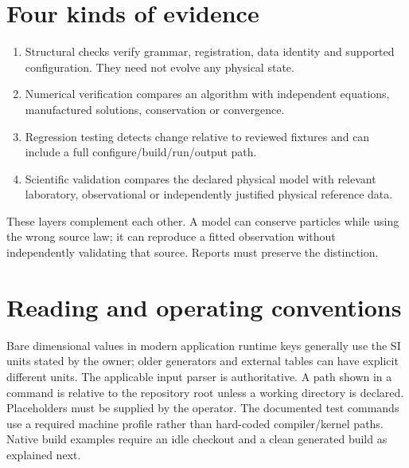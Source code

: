 \section{Four kinds of evidence}
\begin{enumerate}
\item Structural checks verify grammar, registration, data identity and
supported configuration. They need not evolve any physical state.
\item Numerical verification compares an algorithm with independent equations,
manufactured solutions, conservation or convergence.
\item Regression testing detects change relative to reviewed fixtures and can
include a full configure/build/run/output path.
\item Scientific validation compares the declared physical model with relevant
laboratory, observational or independently justified physical reference data.
\end{enumerate}
These layers complement each other. A model can conserve particles while
using the wrong source law; it can reproduce a fitted observation without
independently validating that source. Reports must preserve the distinction.

\section{Reading and operating conventions}
Bare dimensional values in modern application runtime keys generally use the
SI units stated by the owner; older generators and external tables can have
explicit different units. The applicable input parser is authoritative.
A path shown in a command is relative to the repository root unless a working
directory is declared. Placeholders must be supplied by the operator.
The documented test commands use a required machine profile rather than
hard-coded compiler/kernel paths. Native build examples require an idle
checkout and a clean generated build as explained next.

